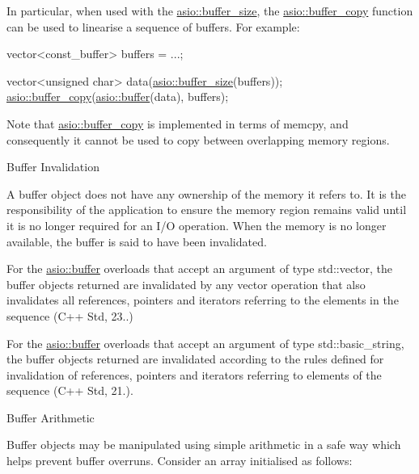 In particular, when used with the \hyperlink{group__buffer__size}{asio\+::buffer\+\_\+size}, the \hyperlink{group__buffer__copy}{asio\+::buffer\+\_\+copy} function can be used to linearise a sequence of buffers. For example\+:


\begin{DoxyCode}
 vector<const\_buffer> buffers = ...;

vector<unsigned char> data(\hyperlink{group__buffer__size_gabe8b5f116fbb66004b6d0ba8ee39c3d5}{asio::buffer\_size}(buffers));
\hyperlink{group__buffer__copy_ga8bc8cbf49a91e58205de746721d614d8}{asio::buffer\_copy}(\hyperlink{group__buffer_ga1ed66e401559cbfd19595392f653b47c}{asio::buffer}(data), buffers); 
\end{DoxyCode}


Note that \hyperlink{group__buffer__copy}{asio\+::buffer\+\_\+copy} is implemented in terms of {\ttfamily memcpy}, and consequently it cannot be used to copy between overlapping memory regions.

\begin{DoxyParagraph}{Buffer Invalidation}

\end{DoxyParagraph}
A buffer object does not have any ownership of the memory it refers to. It is the responsibility of the application to ensure the memory region remains valid until it is no longer required for an I/\+O operation. When the memory is no longer available, the buffer is said to have been invalidated.

For the \hyperlink{group__buffer_ga1ed66e401559cbfd19595392f653b47c}{asio\+::buffer} overloads that accept an argument of type std\+::vector, the buffer objects returned are invalidated by any vector operation that also invalidates all references, pointers and iterators referring to the elements in the sequence (C++ Std, 23..)

For the \hyperlink{group__buffer_ga1ed66e401559cbfd19595392f653b47c}{asio\+::buffer} overloads that accept an argument of type std\+::basic\+\_\+string, the buffer objects returned are invalidated according to the rules defined for invalidation of references, pointers and iterators referring to elements of the sequence (C++ Std, 21.).

\begin{DoxyParagraph}{Buffer Arithmetic}

\end{DoxyParagraph}
Buffer objects may be manipulated using simple arithmetic in a safe way which helps prevent buffer overruns. Consider an array initialised as follows\+:


